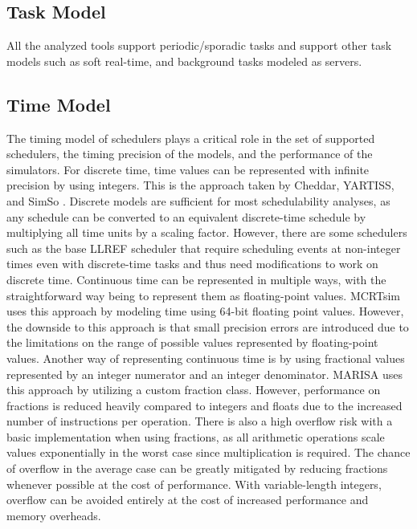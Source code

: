 \documentclass[conference,compsoc]{IEEEtran}
\begin{document}
\subsection{Task Model}
All the analyzed tools support periodic/sporadic tasks and support other task models such as soft real-time, and background tasks modeled as servers.

\subsection{Time Model}
The timing model of schedulers plays a critical role in the set of supported schedulers, the timing precision of the models, and the performance of the simulators. For discrete time, time values can be represented with infinite precision by using integers. This is the approach taken by Cheddar, YARTISS, and SimSo \cite{cheddar_repo, yartiss_docs, simso_repo}. Discrete models are sufficient for most schedulability analyses, as any schedule can be converted to an equivalent discrete-time schedule by multiplying all time units by a scaling factor. However, there are some schedulers such as the base LLREF scheduler that require scheduling events at non-integer times even with discrete-time tasks and thus need modifications to work on discrete time. Continuous time can be represented in multiple ways, with the straightforward way being to represent them as floating-point values. MCRTsim \cite{mcrtsim_repo} uses this approach by modeling time using 64-bit floating point values. However, the downside to this approach is that small precision errors are introduced due to the limitations on the range of possible values represented by floating-point values. Another way of representing continuous time is by using fractional values represented by an integer numerator and an integer denominator. MARISA uses this approach by utilizing a custom fraction class. However, performance on fractions is reduced heavily compared to integers and floats due to the increased number of instructions per operation. There is also a high overflow risk with a basic implementation when using fractions, as all arithmetic operations scale values exponentially in the worst case since multiplication is required. The chance of overflow in the average case can be greatly mitigated by reducing fractions whenever possible at the cost of performance. With variable-length integers, overflow can be avoided entirely at the cost of increased performance and memory overheads.
\end{document}
